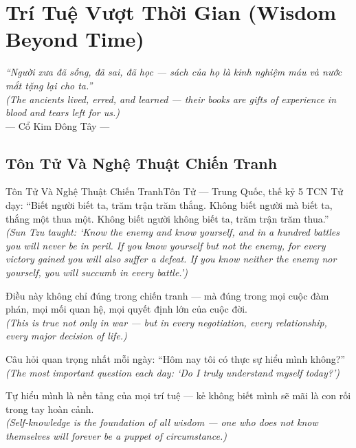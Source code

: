 \chapter{Trí Tuệ Vượt Thời Gian (Wisdom Beyond Time)}
\begin{center}
  \textit{\color{truyengold}``Người xưa đã sống, đã sai, đã học --- sách của họ là kinh nghiệm máu và nước mắt tặng lại cho ta.''}\\[4pt]
  \textit{(The ancients lived, erred, and learned --- their books are gifts of experience in blood and tears left for us.)}\\[4pt]
  \small\color{truyenblue}--- Cổ Kim Đông Tây ---
\end{center}
\ngancach

\section{Tôn Tử Và Nghệ Thuật Chiến Tranh}
\begin{truyen}{Tôn Tử Và Nghệ Thuật Chiến Tranh}{Tôn Tử --- Trung Quốc, thế kỷ 5 TCN}
 Tử dạy: ``Biết người biết ta, trăm trận trăm thắng. Không biết người mà biết ta, thắng một thua một. Không biết người không biết ta, trăm trận trăm thua.''\\[4pt]
\textit{(Sun Tzu taught: `Know the enemy and know yourself, and in a hundred battles you will never be in peril. If you know yourself but not the enemy, for every victory gained you will also suffer a defeat. If you know neither the enemy nor yourself, you will succumb in every battle.')}

Điều này không chỉ đúng trong chiến tranh --- mà đúng trong mọi cuộc đàm phán, mọi mối quan hệ, mọi quyết định lớn của cuộc đời.\\[4pt]
\textit{(This is true not only in war --- but in every negotiation, every relationship, every major decision of life.)}

Câu hỏi quan trọng nhất mỗi ngày: ``Hôm nay tôi có thực sự hiểu mình không?''\\[4pt]
\textit{(The most important question each day: `Do I truly understand myself today?')}

\end{truyen}
\begin{baihoc}
  Tự hiểu mình là nền tảng của mọi trí tuệ --- kẻ không biết mình sẽ mãi là con rối trong tay hoàn cảnh.\\[4pt]
  \textit{(Self-knowledge is the foundation of all wisdom --- one who does not know themselves will forever be a puppet of circumstance.)}
\end{baihoc}

